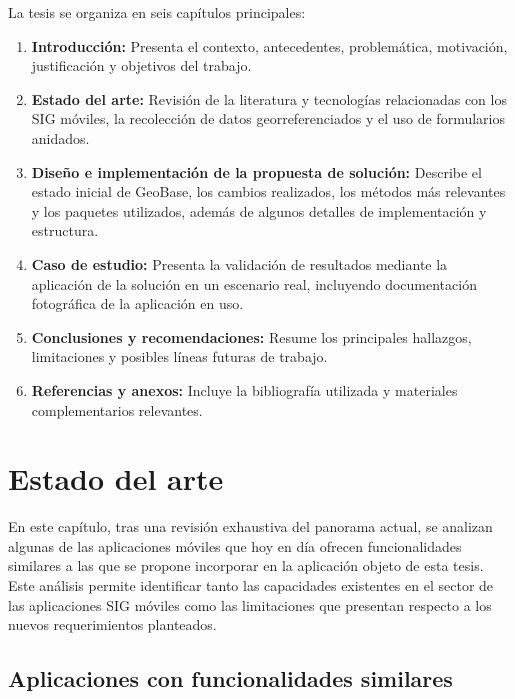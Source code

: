 \documentclass{article}
\providecommand{\tightlist}{%
  \setlength{\itemsep}{0pt}\setlength{\parskip}{0pt}}
\begin{document}
La tesis se organiza en seis capítulos principales:

\begin{enumerate}
\def\labelenumi{\arabic{enumi}.}
\tightlist
\item
  \textbf{Introducción:} Presenta el contexto, antecedentes,
  problemática, motivación, justificación y objetivos del trabajo.
\item
  \textbf{Estado del arte:} Revisión de la literatura y tecnologías
  relacionadas con los SIG móviles, la recolección de datos
  georreferenciados y el uso de formularios anidados.
\item
  \textbf{Diseño e implementación de la propuesta de solución:} Describe el estado inicial de GeoBase, los cambios realizados, los métodos más relevantes y los paquetes utilizados, además de algunos detalles de implementación y estructura.
\item
  \textbf{Caso de estudio:} Presenta la validación de resultados mediante la aplicación de la solución en un escenario real, incluyendo documentación fotográfica de la aplicación en uso.
\item
  \textbf{Conclusiones y recomendaciones:} Resume los principales
  hallazgos, limitaciones y posibles líneas futuras de trabajo.
\item
  \textbf{Referencias y anexos:} Incluye la bibliografía utilizada y
  materiales complementarios relevantes.
\end{enumerate}















\section{Estado del arte}\label{estadodelarte}

En este capítulo, tras una revisión exhaustiva del panorama actual, se analizan algunas de las aplicaciones móviles que hoy en día ofrecen funcionalidades similares a las que se propone incorporar en la aplicación objeto de esta tesis. Este análisis permite identificar tanto las capacidades existentes en el sector de las aplicaciones SIG móviles como las limitaciones que presentan respecto a los nuevos requerimientos planteados.

\subsection{Aplicaciones con funcionalidades similares}
\end{document}
